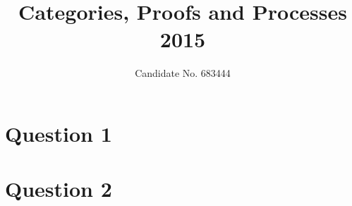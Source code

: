 \documentclass{tufte-handout}
\title{Categories, Proofs and Processes 2015}
\author{Candidate No. 683444}
\begin{document}
\maketitle

\section{Question 1}\label{sec:q-1}


\section{Question 2}\label{sec:q-2}

\end{document}
